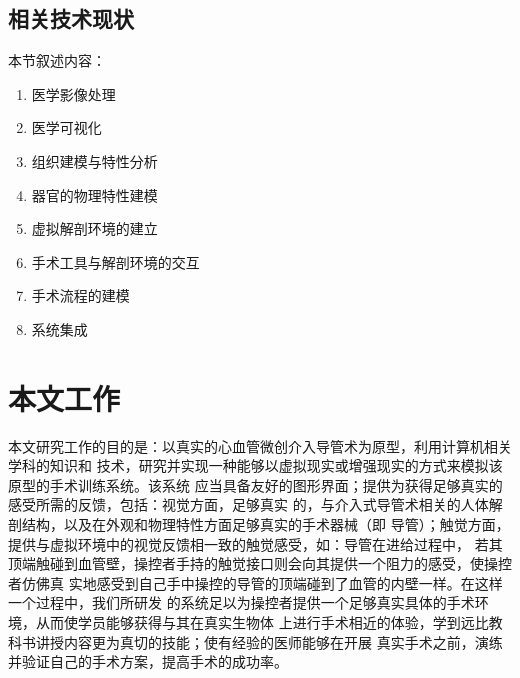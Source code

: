 \subsection{相关技术现状}

本节叙述内容：
\begin{enumerate}
  \item 医学影像处理
  \item 医学可视化
  \item 组织建模与特性分析
  \item 器官的物理特性建模
  \item 虚拟解剖环境的建立
  \item 手术工具与解剖环境的交互
  \item 手术流程的建模
  \item 系统集成
\end{enumerate}

\section{本文工作}


本文研究工作的目的是：以真实的心血管微创介入导管术为原型，利用计算机相关学科的知识和
技术，研究并实现一种能够以虚拟现实或增强现实的方式来模拟该原型的手术训练系统。该系统
应当具备友好的图形界面；提供为获得足够真实的感受所需的反馈，包括：视觉方面，足够真实
的，与介入式导管术相关的人体解剖结构，以及在外观和物理特性方面足够真实的手术器械（即
导管）；触觉方面，提供与虚拟环境中的视觉反馈相一致的触觉感受，如：导管在进给过程中，
若其顶端触碰到血管壁，操控者手持的触觉接口则会向其提供一个阻力的感受，使操控者仿佛真
实地感受到自己手中操控的导管的顶端碰到了血管的内壁一样。在这样一个过程中，我们所研发
的系统足以为操控者提供一个足够真实具体的手术环境，从而使学员能够获得与其在真实生物体
上进行手术相近的体验，学到远比教科书讲授内容更为真切的技能；使有经验的医师能够在开展
真实手术之前，演练并验证自己的手术方案，提高手术的成功率。

